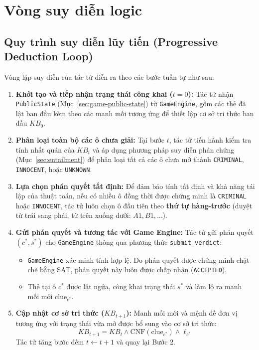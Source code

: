 \section{Vòng suy diễn logic}
\label{sec:deduction_loop}

\subsection{Quy trình suy diễn lũy tiến (Progressive Deduction Loop)}
Vòng lặp suy diễn của tác tử diễn ra theo các bước tuần tự như sau:
\begin{enumerate}
    \item \textbf{Khởi tạo và tiếp nhận trạng thái công khai ($t = 0$):}
    Tác tử nhận \texttt{PublicState} (Mục~\ref{sec:game-public-state}) từ \texttt{GameEngine}, gồm các thẻ đã lật ban đầu kèm theo các manh mối tương ứng để thiết lập cơ sở tri thức ban đầu $KB_0$.
    
    \item \textbf{Phân loại toàn bộ các ô chưa giải:}
    Tại bước $t$, tác tử tiến hành kiểm tra tính nhất quán của $KB_t$ và áp dụng phương pháp suy diễn phản chứng (Mục~\ref{sec:entailment}) để phân loại tất cả các ô chưa mở thành \texttt{CRIMINAL}, \texttt{INNOCENT}, hoặc \texttt{UNKNOWN}.
    
    \item \textbf{Lựa chọn phán quyết tất định:}
    Để đảm bảo tính tất định và khả năng tái lập của thuật toán, nếu có nhiều ô đồng thời được chứng minh là \texttt{CRIMINAL} hoặc \texttt{INNOCENT}, tác tử luôn chọn ô đầu tiên theo \textbf{thứ tự hàng-trước} (duyệt từ trái sang phải, từ trên xuống dưới: $A1, B1, \dots$).
    
    \item \textbf{Gửi phán quyết và tương tác với Game Engine:}
    Tác tử gửi phán quyết $(c^*, s^*)$ cho \texttt{GameEngine} thông qua phương thức \texttt{submit\_verdict}:
    \begin{itemize}
        \item \texttt{GameEngine} xác minh tính hợp lệ. Do phán quyết được chứng minh chặt chẽ bằng SAT, phán quyết này luôn được chấp nhận (\texttt{ACCEPTED}).
        \item Thẻ tại ô $c^*$ được lật ngửa, công khai trạng thái $s^*$ và làm lộ ra manh mối mới $\text{clue}_{c^*}$.
    \end{itemize}
    
    \item \textbf{Cập nhật cơ sở tri thức ($KB_{t+1}$):}
    Manh mối mới và mệnh đề đơn vị tương ứng với trạng thái vừa mở được bổ sung vào cơ sở tri thức:
    \begin{equation}
        KB_{t+1} = KB_t \wedge \text{CNF}(\text{clue}_{c^*}) \wedge \ell_{c^*}
    \end{equation}
    Tác tử tăng bước đếm $t \leftarrow t + 1$ và quay lại Bước 2.
\end{enumerate}

